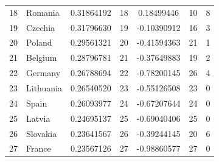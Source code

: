 \begin{longtable}{@{}rlS[table-format=1.8]rS[table-format=2.8]rr@{}}
  18 & Romania & 0.31864192 & 18 & 0.18499446 & 10 & 8 \\
  19 & Czechia & 0.31796630 & 19 & -0.10390912 & 16 & 3 \\
  20 & Poland & 0.29561321 & 20 & -0.41594363 & 21 & 1 \\
  21 & Belgium & 0.28796781 & 21 & -0.37649883 & 19 & 2 \\
  22 & Germany & 0.26788694 & 22 & -0.78200145 & 26 & 4 \\
  23 & Lithuania & 0.26540520 & 23 & -0.55126508 & 23 & 0 \\
  24 & Spain & 0.26093977 & 24 & -0.67207644 & 24 & 0 \\
  25 & Latvia & 0.24695137 & 25 & -0.69040406 & 25 & 0 \\
  26 & Slovakia & 0.23641567 & 26 & -0.39244145 & 20 & 6 \\
  27 & France & 0.23567126 & 27 & -0.98860577 & 27 & 0 \\
\end{longtable}